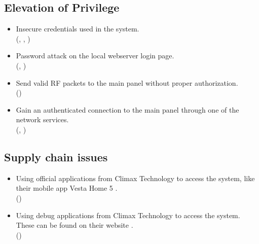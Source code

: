 \subsection{Elevation of Privilege}
\begin{itemize}
    \item Insecure credentials used in the system.
    \\ (, , )
    \item Password attack on the local webserver login page.
    \\ (, )
    \item Send valid RF packets to the main panel without proper authorization.
    \\ ()
    \item Gain an authenticated connection to the main panel through one of the network services.
    \\ (, )
\end{itemize}

\subsection{Supply chain issues}
\begin{itemize}
    \item Using official applications from Climax Technology to access the system, like their mobile app Vesta Home 5 .
    \\ ()
    \item Using debug applications from Climax Technology to access the system. These can be found on their website .
    \\ ()
\end{itemize}
